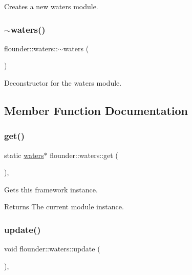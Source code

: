 Creates a new waters module. 

\mbox{\label{classflounder_1_1waters_a75d843a3419deb4f1ee97ac1541b90a0}} 
\subsubsection{\texorpdfstring{$\sim$waters()}{~waters()}}
{\footnotesize\ttfamily flounder\+::waters\+::$\sim$waters (\begin{DoxyParamCaption}{ }\end{DoxyParamCaption})}



Deconstructor for the waters module. 



\subsection{Member Function Documentation}
\mbox{\label{classflounder_1_1waters_a522da05a5715f286c91a453b4a7bc7de}} 
\subsubsection{\texorpdfstring{get()}{get()}}
{\footnotesize\ttfamily static \hyperlink{classflounder_1_1waters}{waters}$\ast$ flounder\+::waters\+::get (\begin{DoxyParamCaption}{ }\end{DoxyParamCaption})\hspace{0.3cm}{\ttfamily [inline]}, {\ttfamily [static]}}



Gets this framework instance. 

\begin{DoxyReturn}{Returns}
The current module instance. 
\end{DoxyReturn}
\mbox{\label{classflounder_1_1waters_aaae93cea613594ea9d66819a63d4d85b}} 
\subsubsection{\texorpdfstring{update()}{update()}}
{\footnotesize\ttfamily void flounder\+::waters\+::update (\begin{DoxyParamCaption}{ }\end{DoxyParamCaption})\hspace{0.3cm}{\ttfamily [override]}, {\ttfamily [virtual]}}



